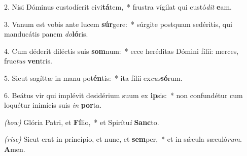2. Nisi Dóminus custodíerit civi\textbf{tá}tem,~* frustra vígilat qui custó\textit{dit} \textbf{e}am.

3. Vanum est vobis ante lucem \textbf{súr}gere:~* súrgite postquam sedéritis, qui manducátis panem \textit{do}\textbf{ló}ris.

4. Cum déderit diléctis suis \textbf{som}\-num:~* ecce heréditas Dómini fílii: merces, fruc\textit{tus} \textbf{ven}tris.

5. Sicut sagíttæ in manu pot\textbf{én}tis:~* ita fílii ex\textit{cus}\textbf{só}rum.

6. Beátus vir qui implévit desidérium suum ex \textbf{ip}sis:~* non confundétur cum loquétur inimícis suis \textit{in} \textbf{por}ta.

\textit{(bow)} Glória Patri, et \textbf{Fí}lio,~* et Spirítu\textit{i} \textbf{Sanc}to.

\textit{(rise)}  Sicut erat in princípio, et nunc, et \textbf{sem}per,~* et in s\'{\ae}cula sæculó\textit{rum}. \textbf{A}men.